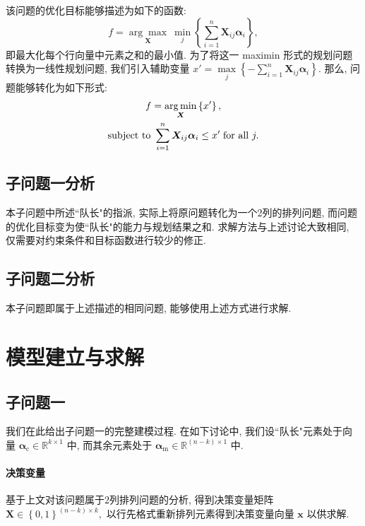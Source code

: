 \documentclass[]{ctexart}
\begin{document}
该问题的优化目标能够描述为如下的函数:
\begin{equation}
    f = \underset{\bm{X}}{\arg\max}\ \underset{j}{\min} \left\{\sum_{i=1}^{n} \bm{X}_{ij}\bm{\alpha}_{i}\right\},
\end{equation}
即最大化每个行向量中元素之和的最小值. 为了将这一 maximin 形式的规划问题转换为一线性规划问题, 我们引入辅助变量 $x' = \underset{j}{\max} \left\{-\sum_{i=1}^{n} \bm{X}_{ij}\bm{\alpha}_{i}\right\}.$ 那么, 问题能够转化为如下形式:
\begin{gather*}
    f = \underset{\bm{X}}{\arg\min} \left\{x'\right\}, \\
    \text{subject to}\ \sum_{i=1}^{n} \bm{X}_{ij}\bm{\alpha}_{i} \le x' \thickspace \text{for all}\ j.
\end{gather*}


\subsection{子问题一分析}

本子问题中所述``队长"的指派, 实际上将原问题转化为一个2列的排列问题, 而问题的优化目标变为使``队长"的能力与规划结果之和. 求解方法与上述讨论大致相同, 仅需要对约束条件和目标函数进行较少的修正.

\subsection{子问题二分析}

本子问题即属于上述描述的相同问题, 能够使用上述方式进行求解.

\section{模型建立与求解}

\subsection{子问题一} \label{subq_1}

我们在此给出子问题一的完整建模过程. 在如下讨论中, 我们设``队长"元素处于向量 $\bm{\alpha}_{\mathrm{c}} \in \mathbb{R}^{k \times 1}$ 中, 而其余元素处于 $\bm{\alpha}_{\mathrm{m}} \in \mathbb{R}^{(n - k) \times 1}$ 中.

\paragraph{决策变量} 基于上文对该问题属于2列排列问题的分析, 得到决策变量矩阵 $\bm{X} \in \left\{0,1\right\}^{(n - k) \times k},$ 以行先格式重新排列元素得到决策变量向量 $\bm{x}$ 以供求解.
\end{document}

